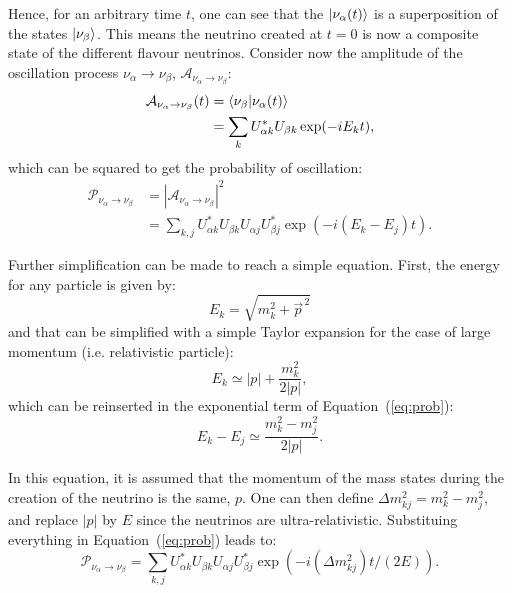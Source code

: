 Hence, for an arbitrary time $t$, one can see that the
$\ket{\nu_\alpha(t)}$ is a superposition of the states
$\ket{\nu_\beta}$. This means the neutrino created at $t=0$ is now a
composite state of the different flavour neutrinos. Consider now the
amplitude of the oscillation process
$\nu_\alpha\rightarrow \nu_\beta$,
$\mathcal{A}_{\nu_\alpha\rightarrow\nu_\beta}$:
\begin{align}
  \mathcal{A}_{\nu_\alpha\rightarrow\nu_\beta}(t) &= \braket{\nu_\beta|\nu_\alpha(t)}\\
                                                  &=\sum_kU^*_{\alpha k}U_{\beta k}\exp(-iE_kt),
\end{align}
which can be squared to get the probability of oscillation:
\begin{align}
  \mathcal{P}_{\nu_\alpha\rightarrow\nu_\beta} &= \left|\mathcal{A}_{\nu_\alpha\rightarrow\nu_\beta}\right|^2 \nonumber \\
                             &=\sum_{k,j}U^*_{\alpha k}U_{\beta k}U_{\alpha j}U^*_{\beta j}\exp\left(-i(E_k-E_j)t\right). \label{eq:prob}
\end{align}

Further simplification can be made to reach a simple equation. First,
the energy for any particle is given by:
\begin{equation}
  E_k=\sqrt{m_k^2+\vec{p}^{\,2}}
\end{equation}
and that can be simplified with a simple Taylor expansion for the case of
large momentum (i.e. relativistic particle):
\begin{equation}
  E_k\simeq |p|+\frac{m_k^2}{2|p|},
\end{equation}
which can be reinserted in the exponential term of Equation~(\ref{eq:prob}):
\begin{equation}
  E_k-E_j\simeq \frac{m_k^2-m_j^2}{2|p|}.
\end{equation}

In this equation, it is assumed that the momentum of the mass states
during the creation of the neutrino is the same, $p$. One can then
define $\Delta m_{kj}^2 = m_k^2-m_j^2$, and replace $|p|$ by $E$ since
the neutrinos are ultra-relativistic. Substituing everything in
Equation~(\ref{eq:prob}) leads to:
\begin{equation}
  \mathcal{P}_{\nu_\alpha\rightarrow\nu_\beta}=\sum_{k,j}U^*_{\alpha k}U_{\beta k}U_{\alpha j}U^*_{\beta j}\exp\left(-i(\Delta m_{kj}^2)t/(2E)\right).
\end{equation}

